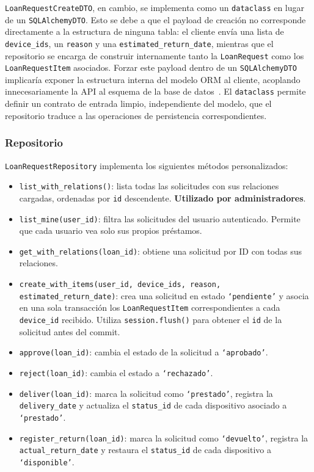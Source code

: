 \texttt{LoanRequestCreateDTO}, en cambio, se implementa como un \texttt{dataclass} en 
lugar de un \texttt{SQLAlchemyDTO}. Esto se debe a que el payload de creación no 
corresponde directamente a la estructura de ninguna tabla: el cliente envía una lista de 
\texttt{device\_ids}, un \texttt{reason} y una \texttt{estimated\_return\_date}, mientras 
que el repositorio se encarga de construir internamente tanto la \texttt{LoanRequest} 
como los \texttt{LoanRequestItem} asociados. Forzar este payload dentro de un 
\texttt{SQLAlchemyDTO} implicaría exponer la estructura interna del modelo ORM al cliente, 
acoplando innecesariamente la API al esquema de la base de datos~\cite{leapcell_sqlalchemy_dataclasses}. El \texttt{dataclass} 
permite definir un contrato de entrada limpio, independiente del modelo, que el repositorio 
traduce a las operaciones de persistencia correspondientes.~\cite{leapcell_decoupling_dto}

\subsubsection*{Repositorio}

\texttt{LoanRequestRepository} implementa los siguientes métodos personalizados:

\begin{itemize}
	\item \texttt{list\_with\_relations()}: lista todas las solicitudes con sus relaciones cargadas, ordenadas por \texttt{id} descendente. \textbf{Utilizado por administradores}.
	\item \texttt{list\_mine(user\_id)}: filtra las solicitudes del usuario autenticado. Permite que cada usuario vea solo sus propios préstamos.
	\item \texttt{get\_with\_relations(loan\_id)}: obtiene una solicitud por ID con todas sus relaciones.
	\item \texttt{create\_with\_items(user\_id, device\_ids, reason, estimated\_return\_date)}: crea una solicitud en estado \texttt{`pendiente'} y asocia en una sola transacción los \texttt{LoanRequestItem} correspondientes a cada \texttt{device\_id} recibido. Utiliza \texttt{session.flush()} para obtener el \texttt{id} de la solicitud antes del commit.
	\item \texttt{approve(loan\_id)}: cambia el estado de la solicitud a \texttt{`aprobado'}.
	\item \texttt{reject(loan\_id)}: cambia el estado a \texttt{`rechazado'}.
	\item \texttt{deliver(loan\_id)}: marca la solicitud como \texttt{`prestado'}, registra la \texttt{delivery\_date} y actualiza el \texttt{status\_id} de cada dispositivo asociado a \texttt{`prestado'}.
	\item \texttt{register\_return(loan\_id)}: marca la solicitud como \texttt{`devuelto'}, registra la \texttt{actual\_return\_date} y restaura el \texttt{status\_id} de cada dispositivo a \texttt{`disponible'}.
\end{itemize}

